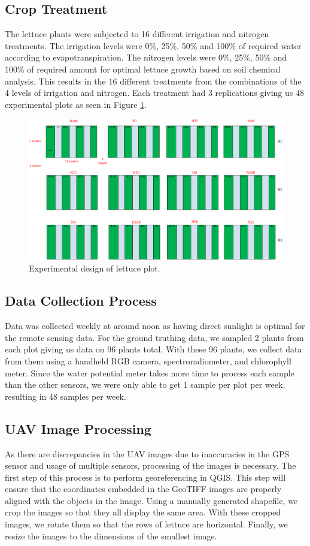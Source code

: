 \subsection{Crop Treatment}
The lettuce plants were subjected to 16 different irrigation and nitrogen treatments. The irrigation levels were 0\%, 25\%, 50\% and 100\% of required water according to evapotranspiration. The nitrogen levels were 0\%, 25\%, 50\% and 100\% of required amount for optimal lettuce growth based on soil chemical analysis. This results in the 16 different treatments from the combinations of the 4 levels of irrigation and nitrogen. Each treatment had 3 replications giving us 48 experimental plots as seen in Figure \ref{lettuce_plot}.


\begin{figure}
    \centering
    \includegraphics[width=1.0\textwidth]{images/plot.png}
    \caption{Experimental design of lettuce plot.}
    \label{lettuce_plot}
\end{figure}

\subsection{Data Collection Process}
Data was collected weekly at around noon as having direct sunlight is optimal for the remote sensing data. For the ground truthing data, we sampled 2 plants from each plot giving us data on 96 plants total.
With these 96 plants, we collect data from them using a handheld RGB camera, spectroradiometer, and chlorophyll meter. Since the water potential meter takes more time to process each sample than the other sensors, we were only able to get 1 sample per plot per week, resulting in 48 samples per week. %

\subsection{UAV Image Processing}
As there are discrepancies in the UAV images due to inaccuracies in the GPS sensor and usage of multiple sensors, processing of the images is necessary. The first step of this process is to perform georeferencing in QGIS. This step will ensure that the coordinates embedded in the GeoTIFF images are properly aligned with the objects in the image. Using a manually generated shapefile, we crop the images so that they all display the same area. With these cropped images, we rotate them so that the rows of lettuce are horizontal. Finally, we resize the images to the dimensions of the smallest image.


